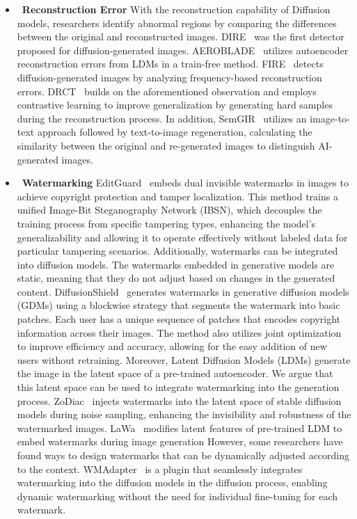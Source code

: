 \begin{itemize}
    \item ~\textbf{Reconstruction Error} 
    With the reconstruction capability of Diffusion models, researchers identify abnormal regions by comparing the differences between the original and reconstructed images. DIRE~\cite{wang2023dire} was the first detector proposed for diffusion-generated images. AEROBLADE~\cite{ricker2024aeroblade} utilizes autoencoder reconstruction errors from LDMs in a train-free method. FIRE~\cite{chu2024fire} detects diffusion-generated images by analyzing frequency-based reconstruction errors. DRCT~\cite{chendrct} builds on the aforementioned observation and employs contrastive learning to improve generalization by generating hard samples during the reconstruction process. In addition, SemGIR~\cite{yu2024semgir} utilizes an image-to-text approach followed by text-to-image regeneration, calculating the similarity between the original and re-generated images to distinguish AI-generated images.

    \item ~\textbf{Watermarking}
    EditGuard~\cite{zhang2024editguard} embeds dual invisible watermarks in images to achieve copyright protection and tamper localization. This method trains a unified Image-Bit Steganography Network (IBSN), which decouples the training process from specific tampering types, enhancing the model's generalizability and allowing it to operate effectively without labeled data for particular tampering scenarios.
    Additionally, watermarks can be integrated into diffusion models. The watermarks embedded in generative models are static, meaning that they do not adjust based on changes in the generated content. 
    DiffusionShield~\cite{cui2023diffusionshield} generates watermarks in generative diffusion models (GDMs) using a blockwise strategy that segments the watermark into basic patches. Each user has a unique sequence of patches that encodes copyright information across their images. The method also utilizes joint optimization to improve efficiency and accuracy, allowing for the easy addition of new users without retraining.
    Moreover, Latent Diffusion Models (LDMs) generate the image in the latent space of a pre-trained autoencoder. We argue that this latent space can be used to integrate watermarking into the generation process.
    ZoDiac~\cite{zhang2024robust} injects watermarks into the latent space of stable diffusion models during noise sampling, enhancing the invisibility and robustness of the watermarked images. LaWa~\cite{rezaei2024lawa} modifies latent features of pre-trained LDM to embed watermarks during image generation
    However, some researchers have found ways to design watermarks that can be dynamically adjusted according to the context. WMAdapter~\cite{ci2024wmadapter} is a plugin that seamlessly integrates watermarking into the diffusion models in the diffusion process, enabling dynamic watermarking without the need for individual fine-tuning for each watermark. 

\end{itemize}

